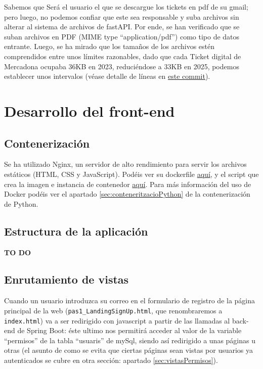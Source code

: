 \documentclass[a4paper,12pt]{report}
\begin{document}
	Sabemos que Será el usuario el que se descargue los tickets en pdf de su gmail; pero luego, no podemos confiar que este sea responsable y suba archivos sin alterar al sistema de archivos de fastAPI. Por ende, se han verificado que se suban archivos en PDF (MIME type ``application/pdf'') como tipo de datos entrante. Luego, se ha mirado que los tamaños de los archivos estén comprendidos entre unos límites razonables, dado que cada Ticket digital de Mercadona ocupaba 36KB en 2023, reduciéndose a 33KB en 2025, podemos establecer unos intervalos (véase detalle de líneas en \href{https://github.com/blackcub3s/mercApp/blob/88fce1d375b0ca0d59814bbda12e42573be376b6/APP%20WEB/__FastAPI__/app/controlador.py#L13-L14}{este commit}).
	
	
	
	\section{Desarrollo del front-end}
	
	\subsection{Contenerización}
	
	Se ha utilizado Nginx, un servidor de alto rendimiento para servir los archivos estáticos (HTML, CSS y JavaScript). Podéis ver su dockerfile \href{https://github.com/blackcub3s/mercApp/blob/main/APP%20WEB/__frontend__produccio__/Dockerfile}{aquí}, y el script que crea la imagen e instancia de contenedor \href{https://github.com/blackcub3s/mercApp/blob/main/APP%20WEB/__frontend__produccio__/creaImatge_i_arrancaContenidor.sh}{aquí}. Para más información del uso de Docker podéis ver el apartado \ref{sec:conteneritzacioPython} de la contenerización de Python.
	
	\subsection{Estructura de la aplicación}
	\label{sec:estructuraAplicacionFrontEnd}
	
	\textbf{TO DO}
	
	\subsection{Enrutamiento de vistas}
	\label{sec:EnrutamientoDeVistas}
	
	Cuando un usuario introduzca su correo en el formulario de registro de la página principal de la web (\texttt{pas1\_LandingSignUp.html}, que renombraremos a \texttt{index.html}) va a ser redirigido con javascript a partir de las llamadas al back-end de Spring Boot: éste ultimo nos permitirá acceder al valor de la variable ``permisos'' de la tabla ``usuaris'' de mySql, siendo así redirigido a unas páginas u otras (el asunto de como se evita que ciertas páginas sean vistas por usuarios ya autenticados se cubre en otra sección: apartado \ref{sec:vistasPermisos}).
	
\end{document}

